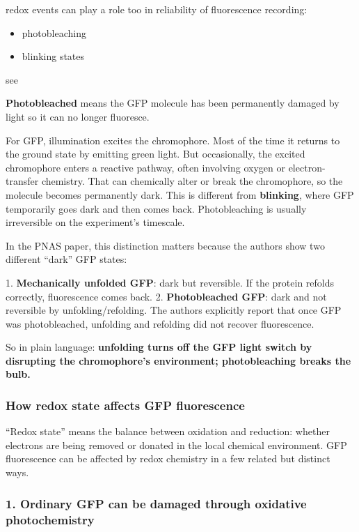 \documentclass{article}
\begin{document}
\begin{fact}
redox events can play a role too in reliability of fluorescence recording:
\begin{itemize}
  \item photobleaching
  \item blinking states
\end{itemize}
see 
\href{https://pmc.ncbi.nlm.nih.gov/articles/PMC1871844/}{\textbullet}
\end{fact}
\textbf{Photobleached} means the GFP molecule has been permanently damaged by light so it can no longer fluoresce.

For GFP, illumination excites the chromophore. Most of the time it returns to the ground state by emitting green light. But occasionally, the excited chromophore enters a reactive pathway, often involving oxygen or electron-transfer chemistry. That can chemically alter or break the chromophore, so the molecule becomes permanently dark. This is different from \textbf{blinking}, where GFP temporarily goes dark and then comes back. Photobleaching is usually irreversible on the experiment's timescale.

In the PNAS paper, this distinction matters because the authors show two different ``dark'' GFP states:

1. \textbf{Mechanically unfolded GFP}: dark but reversible. If the protein refolds correctly, fluorescence comes back.
2. \textbf{Photobleached GFP}: dark and not reversible by unfolding/refolding. The authors explicitly report that once GFP was photobleached, unfolding and refolding did not recover fluorescence. \href{https://www.pnas.org/doi/full/10.1073/pnas.1704937114}{\textbullet}

So in plain language: \textbf{unfolding turns off the GFP light switch by disrupting the chromophore's environment; photobleaching breaks the bulb.}

\subsubsection*{How redox state affects GFP fluorescence}

``Redox state'' means the balance between oxidation and reduction: whether electrons are being removed or donated in the local chemical environment. GFP fluorescence can be affected by redox chemistry in a few related but distinct ways.

\subsubsection*{1. Ordinary GFP can be damaged through oxidative photochemistry}
\end{document}
